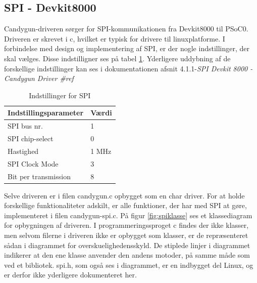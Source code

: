\subsection{SPI - Devkit8000}
Candygun-driveren sørger for SPI-kommunikationen fra Devkit8000 til PSoC0. Driveren er skrevet i c, hvilket er typisk for drivere til linuxplatforme. I forbindelse med design og implementering af SPI, er der nogle indstillinger, der skal vælges. Disse indstilligner ses på tabel \ref{SPItabel}. Yderligere uddybning af de forskellige indstillinger kan ses i dokumentationen afsnit 4.1.1-\textit{SPI Devkit 8000 - Candygun Driver \#ref} 

\begin{table}[H]
	\centering
	\caption{Indstillinger for SPI}
	\label{SPItabel}
	\begin{tabular}{|l|l|}
		\hline
		\textbf{Indstillingsparameter} & \textbf{Værdi} \\ \hline
		SPI bus nr.                    & 1              \\ \hline
		SPI chip-select                & 0              \\ \hline
		Hastighed                      & 1 MHz          \\ \hline
		SPI Clock Mode                 & 3              \\ \hline
		Bit per transmission           & 8              \\ \hline
	\end{tabular}
\end{table}  

\noindent Selve driveren er i filen candygun.c opbygget som en char driver. For at holde forskellige funktionaliteter adskilt, er alle funktioner, der har med SPI at gøre, implementeret i filen candygun-spi.c.  På figur \ref{fig:spiklasse} ses et klassediagram for opbygningen af driveren. I programmeringssproget c findes der ikke klasser, men selvom filerne i driveren ikke er opbygget som klasser, er de repræsenteret sådan i diagrammet for overskuelighedensskyld. De stiplede linjer i diagrammet indikerer at den ene klasse anvender den andens motoder, på samme måde som ved et bibliotek. spi.h, som også ses i diagrammet, er en indbygget del Linux, og er derfor ikke yderligere dokumenteret her. 

